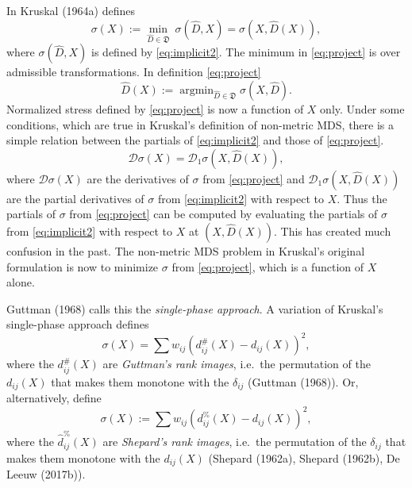 \documentclass[
  12pt,
]{article}
\begin{document}
In Kruskal (1964a) defines
\begin{equation}
\sigma(X):=\min_{\hat D\in\mathfrak{D}}\ \sigma(\hat D,X)=\sigma(X,\hat D(X)),
\label{eq:project}
\end{equation}
where \(\sigma(\hat D,X)\) is defined by
\eqref{eq:implicit2}. The minimum in \eqref{eq:project} is over admissible
transformations. In definition \eqref{eq:project}
\begin{equation}
\hat D(X):=\mathop{\text{argmin}}_{\hat D\in\mathfrak{D}}\sigma(X, \hat D).
\label{eq:optscal}
\end{equation}
Normalized stress defined by \eqref{eq:project} is now a
function of \(X\) only. Under some conditions, which are true in Kruskal's
definition of non-metric MDS, there is a simple relation between the
partials of \eqref{eq:implicit2} and those of \eqref{eq:project}.
\begin{equation}
\mathcal{D}\sigma(X)=\mathcal{D}_1\sigma(X,\hat D(X)),
\label{eq:partials}
\end{equation}
where \(\mathcal{D}\sigma(X)\) are the derivatives of
\(\sigma\) from \eqref{eq:project} and \(\mathcal{D}_1\sigma(X,\hat D(X))\)
are the partial derivatives of \(\sigma\) from \eqref{eq:implicit2} with
respect to \(X\). Thus the partials of \(\sigma\) from \eqref{eq:project} can
be computed by evaluating the partials of \(\sigma\) from
\eqref{eq:implicit2} with respect to \(X\) at \((X,\hat D(X))\). This has
created much confusion in the past. The non-metric MDS problem in Kruskal's original formulation is now to
minimize \(\sigma\) from \eqref{eq:project}, which is a function of \(X\)
alone.

Guttman (1968) calls this the \emph{single-phase approach}. A variation of
Kruskal's single-phase approach defines
\begin{equation}
\sigma(X)=\sum w_{ij}(d_{ij}^\#(X)-d_{ij}(X))^2,
\label{eq:rankimage}
\end{equation}
where the \(d_{ij}^\#(X)\) are \emph{Guttman's rank images}, i.e.~the
permutation of the \(d_{ij}(X)\) that makes them monotone with the
\(\delta_{ij}\) (Guttman (1968)). Or, alternatively, define
\begin{equation}
\sigma(X):=\sum   w_{ij}(d_{ij}^\%(X)-d_{ij}(X))^2,
\label{eq:shepard}
\end{equation}
where the \(\hat d_{ij}^\%(X)\) are \emph{Shepard's rank images}, i.e.~the
permutation of the \(\delta_{ij}\) that makes them monotone with the
\(d_{ij}(X)\) (Shepard (1962a), Shepard (1962b), De Leeuw (2017b)).
\end{document}
